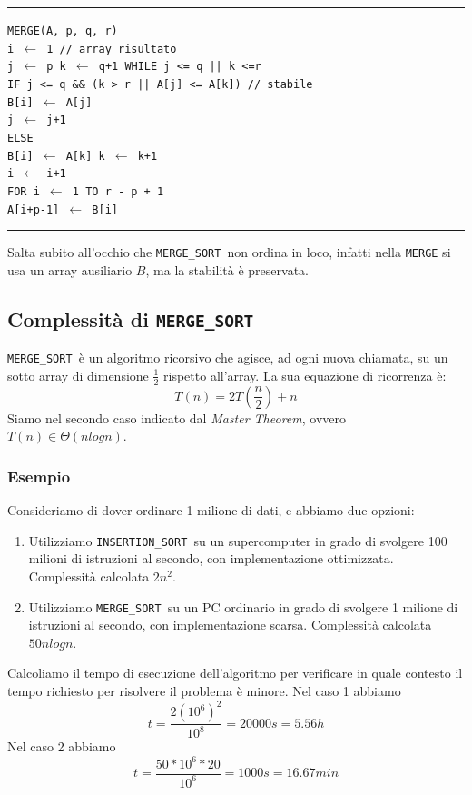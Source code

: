 \documentclass[a4paper,12pt,twoside]{report}
\newcommand\pseudo[1]{\setlength\parindent{0pt}\texttt{#1}\setlength\parindent{24pt} \\}
\newcommand\hlin{\noindent\rule[0.5ex]{\linewidth}{1pt}}
\newcommand\take[2]{#1 $\leftarrow$ #2}
\newcommand\insort{\texttt{INSERTION\_SORT }}
\newcommand\mergesort{\texttt{MERGE\_SORT }}
\begin{document}
\hlin

\pseudo{MERGE(A, p, q, r)}
\texttt{\indent \take{i}{1} \indent // array risultato \\
\indent \take{j}{p}
\indent \take{k}{q+1}
\indent WHILE j <= q || k <=r \\
\indent\indent IF j <= q \&\& (k > r || A[j] <= A[k]) \indent // stabile \\
\indent\indent\indent \take{B[i]}{A[j]} \\
\indent\indent\indent \take{j}{j+1} \\
\indent\indent ELSE \\
\indent\indent\indent \take{B[i]}{A[k]}
\indent\indent\indent \take{k}{k+1} \\
\indent\indent \take{i}{i+1} \\
\indent FOR \take{i}{1} TO r - p + 1 \\
\indent\indent \take{A[i+p-1]}{B[i]} \\
}

\hlin

Salta subito all'occhio che \mergesort non ordina in loco, infatti nella \texttt{MERGE} si usa un array ausiliario $B$, ma la stabilit\`{a} \`{e} preservata. 

\subsection{Complessit\`{a} di \mergesort}

\mergesort \`{e} un algoritmo ricorsivo che agisce, ad ogni nuova chiamata, su un sotto array di dimensione $\frac{1}{2}$ rispetto all'array. La sua equazione di ricorrenza \`{e}:
\[ T(n) = 2T(\frac{n}{2}) + n \]
Siamo nel secondo caso indicato dal \emph{Master Theorem}, ovvero $T(n) \in \Theta(n log n)$.

\subsubsection{Esempio}
Consideriamo di dover ordinare 1 milione di dati, e abbiamo due opzioni:
\begin{enumerate}
\item Utilizziamo \insort su un supercomputer in grado di svolgere 100 milioni di istruzioni al secondo, con implementazione ottimizzata.  Complessit\`{a} calcolata $2n^2$.
\item Utilizziamo \mergesort su un PC ordinario in grado di svolgere 1 milione di istruzioni al secondo, con implementazione scarsa. Complessit\`{a} calcolata $50n log n$.
\end{enumerate}
Calcoliamo il tempo di esecuzione dell'algoritmo per verificare in quale contesto il tempo richiesto per risolvere il problema \`{e} minore. Nel caso 1 abbiamo
\[ t = \frac{2(10^6)^2}{10^8} = 20000 s = 5.56 h \]
Nel caso 2 abbiamo
\[ t = \frac{50 * 10^6 * 20}{10^6} = 1000 s = 16.67 min \]
\end{document}
